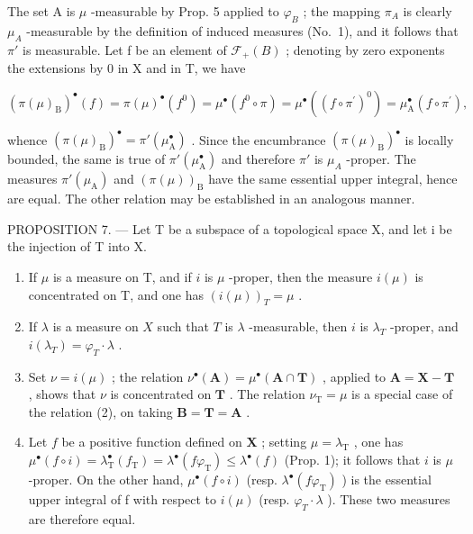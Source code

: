 The set A is \(\mu\) -measurable by Prop. 5 applied to \(\varphi_{B}\) ; the mapping \(\pi_{A}\) is clearly \(\mu_{A}\) -measurable by the definition of induced measures (No.~1), and it follows that \(\pi'\) is measurable. Let f be an element of \(\mathcal{F}_{+}(B)\) ; denoting by zero exponents the extensions by 0 in X and in T, we have

\[
\left(\pi (\mu) _ {\mathrm{B}}\right) ^ {\bullet} (f) = \pi (\mu) ^ {\bullet} \left(f ^ {0}\right) = \mu^ {\bullet} \left(f ^ {0} \circ \pi\right) = \mu^ {\bullet} \left(\left(f \circ \pi^ {\prime}\right) ^ {0}\right) = \mu_ {\mathrm{A}} ^ {\bullet} \left(f \circ \pi^ {\prime}\right),
\]

whence \(\left(\pi(\mu)_{\mathrm{B}}\right)^{\bullet} = \pi'(\mu_{\mathrm{A}}^{\bullet})\) . Since the encumbrance \(\left(\pi(\mu)_{\mathrm{B}}\right)^{\bullet}\) is locally bounded, the same is true of \(\pi'(\mu_{\mathrm{A}}^{\bullet})\) and therefore \(\pi'\) is \(\mu_{A}\) -proper. The measures \(\pi'(\mu_{\mathrm{A}})\) and \(\left(\pi(\mu)\right)_{\mathrm{B}}\) have the same essential upper integral, hence are equal. The other relation may be established in an analogous manner.

PROPOSITION 7. --- Let T be a subspace of a topological space X, and let i be the injection of T into X.

\begin{enumerate}
\def\labelenumi{\alph{enumi})}
\item
  If \(\mu\) is a measure on T, and if \(i\) is \(\mu\) -proper, then the measure \(i(\mu)\) is concentrated on T, and one has \((i(\mu))_{T} = \mu\) .
\item
  If \(\lambda\) is a measure on \(X\) such that \(T\) is \(\lambda\) -measurable, then \(i\) is \(\lambda_{T}\) -proper, and \(i(\lambda_T) = \varphi_T \cdot \lambda\) .
\item
  Set \(\nu = i(\mu)\) ; the relation \(\nu^{\bullet}(\mathbf{A}) = \mu^{\bullet}(\mathbf{A} \cap \mathbf{T})\) , applied to \(\mathbf{A} = \mathbf{X} - \mathbf{T}\) , shows that \(\nu\) is concentrated on \(\mathbf{T}\) . The relation \(\nu_{\mathrm{T}} = \mu\) is a special case of the relation (2), on taking \(\mathbf{B} = \mathbf{T} = \mathbf{A}\) .
\item
  Let \(f\) be a positive function defined on \(\mathbf{X}\) ; setting \(\mu = \lambda_{\mathrm{T}}\) , one has \(\mu^{\bullet}(f \circ i) = \lambda_{\mathrm{T}}^{\bullet}(f_{\mathrm{T}}) = \lambda^{\bullet}(f\varphi_{\mathrm{T}}) \leqslant \lambda^{\bullet}(f)\) (Prop. 1); it follows that \(i\) is \(\mu\) -proper. On the other hand, \(\mu^{\bullet}(f \circ i)\) (resp. \(\lambda^{\bullet}(f\varphi_{\mathrm{T}})\) ) is the essential upper integral of f with respect to \(i(\mu)\) (resp. \(\varphi_{T} \cdot \lambda\) ). These two measures are therefore equal.
\end{enumerate}

